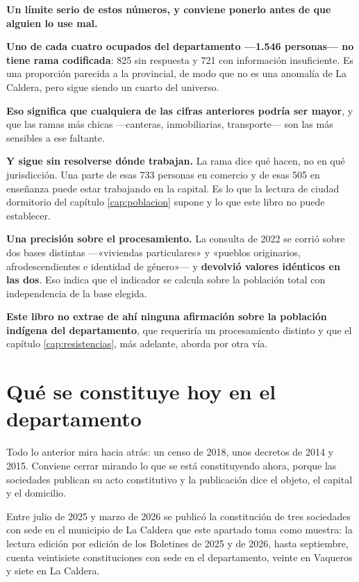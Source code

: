 \begin{cautela}
\textbf{Un límite serio de estos números, y conviene ponerlo antes de que alguien lo use mal.}

\textbf{Uno de cada cuatro ocupados del departamento ---1.546 personas--- no tiene rama
codificada}: 825 sin respuesta y 721 con información insuficiente. Es una proporción parecida a
la provincial, de modo que no es una anomalía de La Caldera, pero sigue siendo un cuarto del
universo.

\textbf{Eso significa que cualquiera de las cifras anteriores podría ser mayor}, y que las ramas
más chicas ---canteras, inmobiliarias, transporte--- son las más sensibles a ese faltante.

\textbf{Y sigue sin resolverse dónde trabajan.} La rama dice qué hacen, no en qué jurisdicción.
Una parte de esas 733 personas en comercio y de esas 505 en enseñanza puede estar trabajando en
la capital. Es lo que la lectura de ciudad dormitorio del capítulo \ref{cap:poblacion} supone y
lo que este libro no puede establecer.
\end{cautela}

\begin{cautela}
\textbf{Una precisión sobre el procesamiento.} La consulta de 2022 se corrió sobre dos bases
distintas ---«viviendas particulares» y «pueblos originarios, afrodescendientes e identidad de
género»--- y \textbf{devolvió valores idénticos en las dos}. Eso indica que el indicador se
calcula sobre la población total con independencia de la base elegida.

\textbf{Este libro no extrae de ahí ninguna afirmación sobre la población indígena del
departamento}, que requeriría un procesamiento distinto y que el capítulo
\ref{cap:resistencias}, más adelante, aborda por otra vía.
\end{cautela}

\section{Qué se constituye hoy en el departamento}

Todo lo anterior mira hacia atrás: un censo de 2018, unos decretos de 2014 y 2015. Conviene
cerrar mirando lo que se está constituyendo ahora, porque las sociedades publican su acto
constitutivo y la publicación dice el objeto, el capital y el domicilio.

Entre julio de 2025 y marzo de 2026 se publicó la constitución de tres sociedades con sede en el
municipio de La Caldera que este apartado toma como muestra: la lectura edición por edición de los Boletines de 2025 y de 2026, hasta septiembre, cuenta veintisiete constituciones con sede en el departamento, veinte en Vaqueros y siete en La Caldera.

